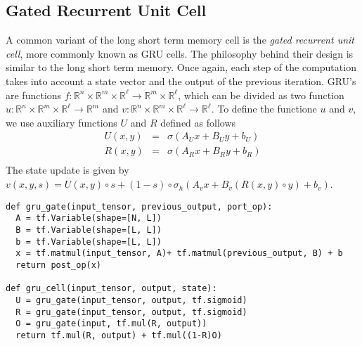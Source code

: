 \documentclass[10pt]{amsart}
\newcommand{\R}{\mathbb{R}}
\theoremstyle{definition}
\begin{document}


\subsection{Gated Recurrent Unit Cell} A common variant of the long short term memory cell is the {\em gated recurrent unit cell}, more commonly known as GRU cells.  The philosophy behind their design is similar to the long short term memory. Once again, each step of the computation takes into account a state vector and the output of the previous iteration. GRU's are functions  $f:\R^n\times \R^m\times \R^{\ell}\to \R^m\times \R^{\ell}$,  which can be divided as two function $u:\R^{n}\times\R^m\times \R^{\ell}\to \R^m$ and $v:\R^n\times \R^m\times\R^{\ell}\to \R^{\ell}$. To define the functione $u$ and $v$, we use auxiliary functions $U$ and  $R$ defined as follows
\begin{eqnarray*}
  U(x, y) &=& \sigma(A_Ux + B_Uy + b_U)\\
  R(x, y) &=& \sigma(A_Rx + B_Ry + b_R)\\
\end{eqnarray*}
The state update is given by $v(x, y, s) = U(x, y)\circ s + (1-s)\circ \sigma_h(A_v x + B_v(R(x, y)\circ y) + b_v)$.

\begin{verbatim}
def gru_gate(input_tensor, previous_output, port_op):
  A = tf.Variable(shape=[N, L])
  B = tf.Variable(shape=[L, L])
  b = tf.Variable(shape=[L, L])
  x = tf.matmul(input_tensor, A)+ tf.matmul(previous_output, B) + b
  return post_op(x)

def gru_cell(input_tensor, output, state):
  U = gru_gate(input_tensor, output, tf.sigmoid)
  R = gru_gate(input_tensor, output, tf.sigmoid)
  O = gru_gate(input, tf.mul(R, output))
  return tf.mul(R, output) + tf.mul((1-R)O)
\end{verbatim}
\end{document}

